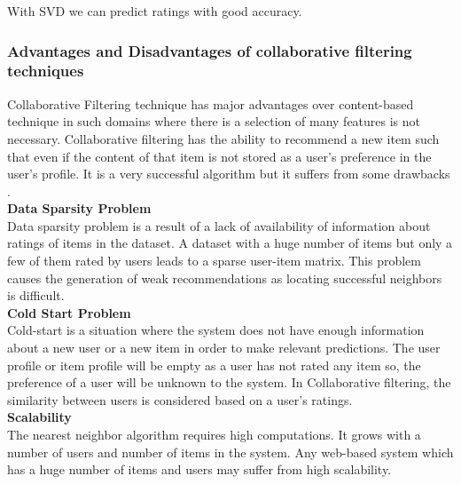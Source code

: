 \noindent With SVD we can predict ratings with good accuracy.

\subsubsection{Advantages and Disadvantages of collaborative filtering techniques}
\label{cf_pros_cons}
Collaborative Filtering technique has major advantages over content-based technique in such domains where there is a selection of many features is not necessary. Collaborative filtering has the ability to recommend a new item such that even if the content of that item is not stored as a user's preference in the user's profile. It is a very successful algorithm but it suffers from some drawbacks \cite{10}.
\\
\noindent \textbf{Data Sparsity Problem}
\\
Data sparsity problem is a result of a lack of availability of information about ratings of items in the dataset. A dataset with a huge number of items but only a few of them rated by users leads to a sparse user-item matrix. This problem causes the generation of weak recommendations as locating successful neighbors is difficult.
\\
\noindent \textbf{Cold Start Problem}
\\
Cold-start is a situation where the system does not have enough information about a new user or a new item in order to make relevant predictions. The user profile or item profile will be empty as a user has not rated any item so, the preference of a user will be unknown to the system. In Collaborative filtering, the similarity between users is considered based on a user's ratings.
\\
\noindent \textbf{Scalability}
\\
The nearest neighbor algorithm requires high computations. It grows with a number of users and number of items in the system. Any web-based system which has a huge number of items and users may suffer from high scalability.


